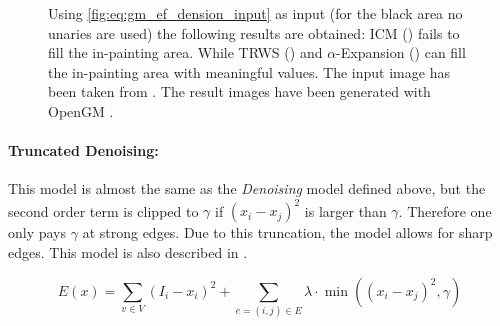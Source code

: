 \begin{figure}[H]
{        Using \cref{fig:eq:gm_ef_dension_input} as input (for the black area no unaries 
        are used)
        the following
        results are obtained:
        ICM
         \citep{besag_1986_icm} () fails
        to fill the in-painting area. 
        While TRWS
        \citep{kolmogorov_2006_pami_trws}  () 
        and $\alpha$-Expansion
        \citep{boykov_2001_pami} () 
        can fill the in-painting area
        with meaningful values.
        The input image has been taken from \citep{szeliski_2008_pami}.
        The result images have been generated with OpenGM \citep{andres_2012_opengm_arxiv}.
    }\label{fig:gm_ef_denoise}
\end{figure}




\paragraph{Truncated Denoising:} 

This model is almost the same as the \emph{Denoising} model defined above,
but the second order term is clipped to $\gamma$ if $(x_i-x_j)^2$ is larger than $\gamma$.
Therefore one only pays $\gamma$ at strong edges.
Due to this truncation, the model allows for sharp edges.
This model is also described in \citep{szeliski_2008_pami}.


\begin{equation} \label{eq:gm_ef_dension_truncated}
E(x) = \sum_{v \in V}  (I_i - x_i)^2 + \sum_{e=(i,j) \in E } \lambda \cdot \min\left( (x_i-x_j)^2, \gamma\right)
\end{equation}

